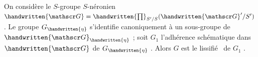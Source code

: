 On considère le $S$-groupe $S$-néronien $\handwritten{\mathscr G}=\handwritten{\prod}_{S'/S}(\handwritten{\mathscr G}'/S')$. Le groupe $G_{\handwritten{\eta}}$
s'identifie canoniquement à un sous-groupe de $\handwritten{\mathscr G}_{\handwritten{\eta}}$ ; soit $G_1$ l'adhérence
schématique dans $\handwritten{\mathscr G}$ de $G_{\handwritten{\eta}}$ . Alors $G$ est le \textquotedbl lissifié \textquotedbl\ de $G_1$ .
